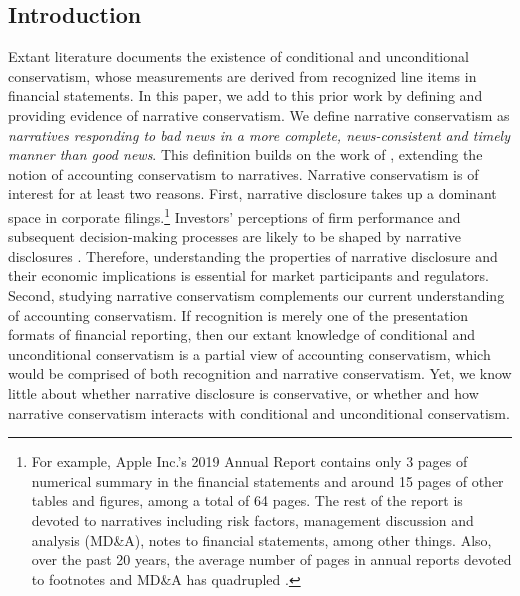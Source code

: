 \documentclass[a4paper]{article}
\begin{document}
\begin{spacing}{2}
\clearpage

\setcounter{page}{1}
\section{Introduction}
Extant literature documents the existence of conditional and unconditional conservatism, whose measurements are derived from recognized line items in financial statements. %
In this paper, we add to this prior work by defining and providing evidence of narrative conservatism. We define narrative conservatism as \textit{narratives responding to bad news in a more complete, news-consistent and timely manner than good news}. This definition builds on the work of , extending the notion of accounting conservatism to narratives. Narrative conservatism is of interest for at least two reasons. First, narrative disclosure takes up a dominant space in corporate filings.\footnote{For example, Apple Inc.'s 2019 Annual Report contains only 3 pages of numerical summary in the financial statements and around 15 pages of other tables and figures, among a total of 64 pages. The rest of the report is devoted to narratives including risk factors, management discussion and analysis (MD\&A), notes to financial statements, among other things. Also, over the past 20 years, the average number of pages in annual reports devoted to footnotes and MD\&A has quadrupled \cite{eyPointNowTime2012}.} Investors' perceptions of firm performance and subsequent decision-making processes are likely to be shaped by narrative disclosures . Therefore, understanding the properties of narrative disclosure and their economic implications is essential for market participants and regulators. Second, studying narrative conservatism complements our current understanding of accounting conservatism. If recognition is merely one of the presentation formats of financial reporting, then our extant knowledge of conditional and unconditional conservatism is a partial view of accounting conservatism, which would be comprised of both recognition and narrative conservatism. Yet, we know little about whether narrative disclosure is conservative, or whether and how narrative conservatism interacts with conditional and unconditional conservatism.


\end{spacing}
\end{document}
